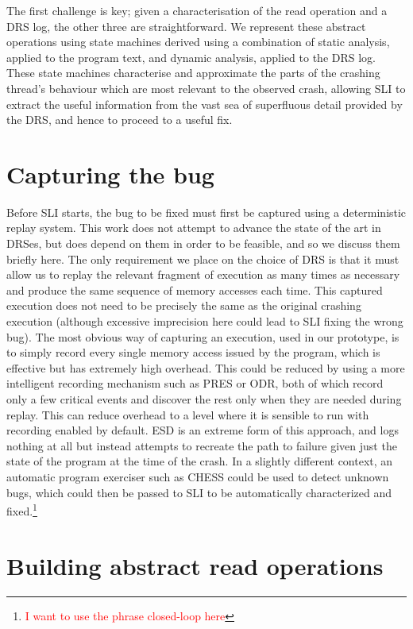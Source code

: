 \documentclass[10pt,twocolumn,preprint,natbib,authoryear]{sigplanconf}
\newcommand{\editorial}[1]{\textcolor{red}{\footnote{\textcolor{red}{#1}}}}
\begin{document}
The first challenge is key; given a characterisation of the read
operation and a DRS log, the other three are straightforward.  We
represent these abstract operations using state machines derived using
a combination of static analysis, applied to the program text, and
dynamic analysis, applied to the DRS log.  These state machines
characterise and approximate the parts of the crashing thread's
behaviour which are most relevant to the observed crash, allowing SLI
to extract the useful information from the vast sea of superfluous
detail provided by the DRS, and hence to proceed to a useful fix.

\section{Capturing the bug}

Before SLI starts, the bug to be fixed must first be captured using a
deterministic replay system.  This work does not attempt to advance
the state of the art in DRSes, but does depend on them in order to be
feasible, and so we discuss them briefly here.  The only requirement
we place on the choice of DRS is that it must allow us to replay the
relevant fragment of execution as many times as necessary and produce
the same sequence of memory accesses each time.  This captured
execution does not need to be precisely the same as the original
crashing execution (although excessive imprecision here could lead to
SLI fixing the wrong bug).  The most obvious way of capturing an
execution, used in our prototype, is to simply record every single
memory access issued by the program, which is effective but has
extremely high overhead.  This could be reduced by using a more
intelligent recording mechanism such as PRES or ODR\cite{Altekar2009},
both of which record only a few critical events and discover the rest
only when they are needed during replay.  This can reduce overhead to
a level where it is sensible to run with recording enabled by default.
ESD\cite{Zamfir2010} is an extreme form of this approach, and logs
nothing at all but instead attempts to recreate the path to failure
given just the state of the program at the time of the crash.  In a
slightly different context, an automatic program exerciser such as
CHESS\cite{Musuvathi2008} could be used to detect unknown bugs, which
could then be passed to SLI to be automatically characterized and
fixed.\editorial{I want to use the phrase closed-loop here}

\section{Building abstract read operations}
\label{sect:build_state_machines}
\end{document}
